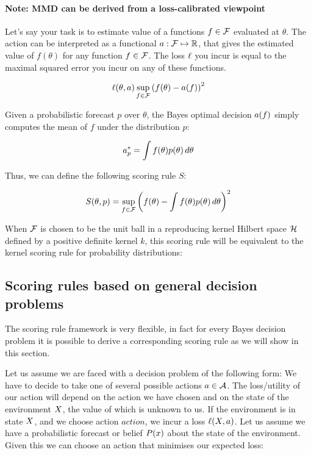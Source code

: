 \paragraph{Note: MMD can be derived from a  loss-calibrated viewpoint}

Let's say your task is to estimate value of a functions $f\in{\mathcal{F}}$ evaluated at $\theta$. The action can be interpreted as a functional $a:\mathcal{F}\mapsto\mathbb{R}$, that gives the estimated value of $f(\theta)$ for any function $f\in\mathcal{F}$. The loss $\ell$ you incur is equal to the maximal squared error you incur on any of these functions.

\begin{equation}
\ell(\theta, a) \sup_{f\in\mathcal{F}}\left( f(\theta) - a(f)\right)^2
\end{equation}

Given a probabilistic forecast $p$ over $\theta$, the Bayes optimal decision $a(f)$ simply computes the mean of $f$ under the distribution $p$:

\begin{equation}
 a^{*}_{p} = \int f(\theta)p(\theta)\,d\theta
\end{equation}

Thus, we can define the following scoring rule $S$:

\begin{equation}
	S(\theta,p) = \sup_{f\in\mathcal{F}}\left( f(\theta) - \int f(\theta)p(\theta)\,d\theta \right)^2
\end{equation}

When $\mathcal{F}$ is chosen to be the unit ball in a reproducing kernel Hilbert space $\mathcal{H}$ defined by a positive definite kernel $k$, this scoring rule will be equivalent to the kernel scoring rule for probability distributions:


\subsection{Scoring rules based on general decision problems}

The scoring rule framework is very flexible, in fact for every Bayes decision problem it is possible to derive a corresponding scoring rule as we will show in this section.

Let us assume we are faced with a decision problem of the following form: We have to decide to take one of several possible actions $a\in\mathcal{A}$. The loss/utility of our action will depend on the action we have chosen and on the state of the environment $X$, the value of which is unknown to us. If the environment is in state $X$, and we choose action $action$, we incur a loss $\ell(X,a)$. Let us assume we have a probabilistic forecast or belief $P(x)$ about the state of the environment. Given this we can choose an action that minimises our expected loss:

